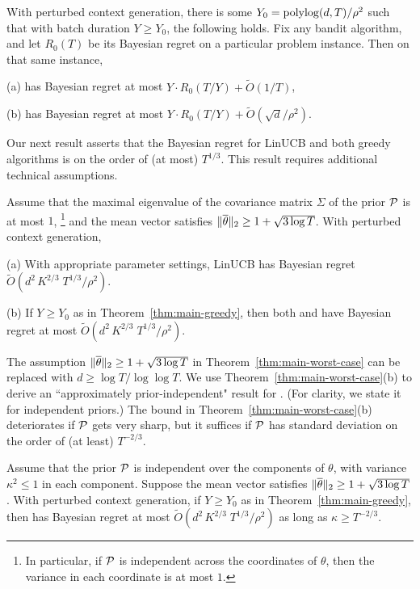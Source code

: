 \begin{theorem}
With perturbed context generation, there is some
  $Y_0 = \polylog(d, T)/\rho^2$
such that with batch duration $Y\geq Y_0$, the following holds. Fix any bandit algorithm, and let $R_0(T)$ be its Bayesian regret on a particular problem instance. Then on that same instance,
\begin{OneLiners}
\item[(a)] \bg has Bayesian regret at most
    $Y \cdot R_0(T/Y) + \tilde O(1/T)$,
\item[(b)]\fg has Bayesian regret at most
    $Y \cdot R_0(T/Y) + \tilde O(\sqrt{d}/\rho^2).$
\end{OneLiners}
\label{thm:main-greedy}
\end{theorem}

Our next result asserts that the Bayesian regret for LinUCB and both greedy algorithms is on the order of (at most) $T^{1/3}$. This result requires additional technical assumptions.

\begin{theorem}
Assume that the maximal eigenvalue of the covariance matrix $\Sigma$ of the prior $\mathcal{P}$ is at most $1$,%
\footnote{In particular, if $\mathcal{P}$ is independent across the coordinates of
$\theta$, then the variance in each coordinate is at most $1$.}
and the mean vector satisfies
    $\|\overline \theta\|_2\geq 1+\sqrt{3 \log T} $.
With perturbed context generation,
\begin{OneLiners}
\item[(a)] With appropriate parameter settings, LinUCB has Bayesian regret
    $\tilde O(d^2\,K^{2/3}\;T^{1/3}/\rho^2)$.
\item[(b)]If $Y\geq Y_0$ as in Theorem~\ref{thm:main-greedy}, then both \bg and \fg have Bayesian regret at most
    $\tilde O(d^2\,K^{2/3}\;T^{1/3}/\rho^2)$.
\end{OneLiners}
\label{thm:main-worst-case}
\end{theorem}

The assumption $\|\overline \theta\|_2\geq 1+\sqrt{3 \log T} $ in Theorem~\ref{thm:main-worst-case} can be replaced with $d \ge \log T/\log \log T$.
We use Theorem~\ref{thm:main-worst-case}(b) to derive an ``approximately prior-independent" result for \fg. (For clarity, we state it for independent priors.) The bound in Theorem~\ref{thm:main-worst-case}(b) deteriorates if $\mathcal{P}$ gets very sharp, but it suffices if $\mathcal{P}$ has standard deviation on the order of (at least) $T^{-2/3}$.

\begin{corollary}
Assume that the prior $\mathcal{P}$ is independent over the components of $\theta$, with variance $\kappa^2\leq 1$ in each component. Suppose the mean vector satisfies
    $\|\overline \theta\|_2\geq 1+\sqrt{3 \log T} $.
With perturbed context generation, if $Y\geq Y_0$ as in Theorem~\ref{thm:main-greedy}, then \fg has Bayesian regret at most
    $\tilde O(d^2\,K^{2/3}\;T^{1/3}/\rho^2)$
as long as $\kappa\geq T^{-2/3}$.
\label{cor:sharp-priors}
\end{corollary}

